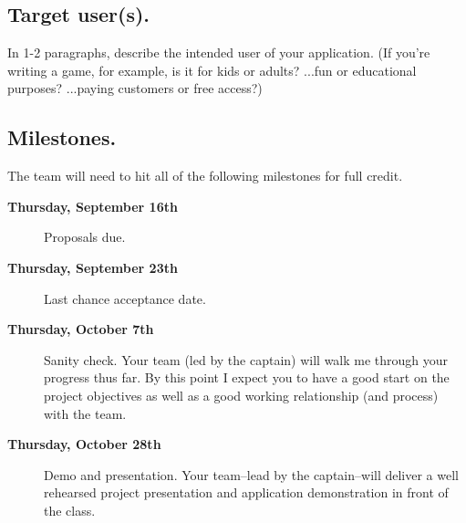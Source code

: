 \documentclass[11pt]{article}
\begin{document}
\underline{\phantom{\hspace{5in}}}

\subsection{Target user(s).}
In 1-2 paragraphs, describe the intended user of your application. (If you're writing a game, for example, is it for kids or adults? ...fun or educational purposes? ...paying customers or free access?)


\underline{\phantom{\hspace{5in}}}

\underline{\phantom{\hspace{5in}}}

\underline{\phantom{\hspace{5in}}}

\underline{\phantom{\hspace{5in}}}

\underline{\phantom{\hspace{5in}}}

\underline{\phantom{\hspace{5in}}}

\underline{\phantom{\hspace{5in}}}

\underline{\phantom{\hspace{5in}}}

\underline{\phantom{\hspace{5in}}}

\subsection{Milestones.}
The team will need to hit all of the following milestones for full credit.

\begin{description}
\item[\bf Thursday, September 16th] Proposals due. 
\item[\bf Thursday, September 23th] Last chance acceptance date. 
\item[\bf Thursday, October 7th] Sanity check. Your team (led by the captain) will walk me through your progress thus far. By this point I expect you to have a good start on the project objectives as well as a good working relationship (and process) with the team.
\item[\bf Thursday, October 28th] Demo and presentation. Your team--lead by the captain--will deliver a well rehearsed project presentation and application demonstration in front of the class.
\end{description}
\end{document}
